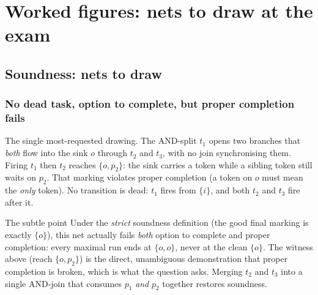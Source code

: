 \newpage
\section{Worked figures: nets to draw at the exam}

\subsection{Soundness: nets to draw}

\subsubsection{No dead task, option to complete, but proper completion fails}

The single most-requested drawing. The AND-split $t_1$ opens two branches that \emph{both} flow into the sink $o$ through $t_2$ and $t_3$, with no join synchronising them. Firing $t_1$ then $t_2$ reaches $\{o, p_2\}$: the sink carries a token while a sibling token still waits on $p_2$. That marking violates proper completion (a token on $o$ must mean the \emph{only} token). No transition is dead: $t_1$ fires from $\{i\}$, and both $t_2$ and $t_3$ fire after it.
\begin{center}
\end{center}
\begin{notebox}{The subtle point}
Under the \emph{strict} soundness definition (the good final marking is exactly $\{o\}$), this net actually fails \emph{both} option to complete and proper completion: every maximal run ends at $\{o,o\}$, never at the clean $\{o\}$. The witness above (reach $\{o,p_2\}$) is the direct, unambiguous demonstration that proper completion is broken, which is what the question asks. Merging $t_2$ and $t_3$ into a single AND-join that consumes $p_1$ \emph{and} $p_2$ together restores soundness.
\end{notebox}

